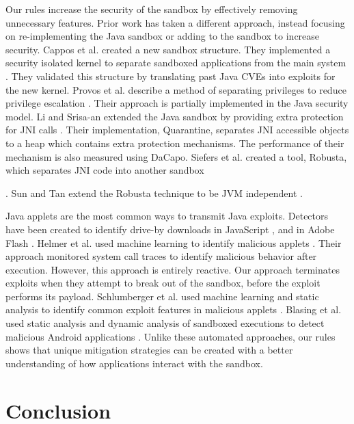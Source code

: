 \documentclass{sig-alternate}
\begin{document}
Our rules increase the security of the sandbox
by effectively removing unnecessary features. Prior work has taken a different
approach, instead focusing on re-implementing the Java sandbox or
adding to the sandbox to increase security. Cappos et al. created
a new sandbox structure. They implemented a security isolated kernel
to separate sandboxed applications from the main system \cite{cappos_retaining_2010}.
They validated this structure by translating past Java CVEs into exploits
for the new kernel. Provos et al. describe a method of separating
privileges to reduce privilege escalation \cite{Provos-PrivilegeEscalation}.
Their approach is partially implemented in the Java security model.
Li and Srisa-an extended the Java sandbox by providing extra protection
for JNI calls \cite{li_quarantine:_2011}. Their implementation, Quarantine,
separates JNI accessible objects to a heap which contains extra protection
mechanisms. The performance of their mechanism is also measured using
DaCapo. Siefers et al. created a tool, Robusta, which separates JNI
code into another sandbox \cite{siefers_robusta:_2010}%

. Sun and Tan extend the Robusta technique to be JVM independent \cite{sun_jvm-portable_2012}. 

Java applets are the most common ways to transmit Java exploits. Detectors
have been created to identify drive-by downloads in JavaScript \cite{cova_detection_2010},
and in Adobe Flash \cite{ford_analyzing_2009}. Helmer et al. used
machine learning to identify malicious applets \cite{helmer_anomalous_2001}.
Their approach monitored system call traces to identify malicious
behavior after execution. However, this approach is entirely reactive.
Our approach terminates exploits when they attempt to break out of
the sandbox, before the exploit performs its payload. Schlumberger
et al. used machine learning and static analysis to identify common
exploit features in malicious applets \cite{schlumberger_jarhead_2012}.
Blasing et al. used static analysis and dynamic analysis of sandboxed
executions to detect malicious Android applications \cite{Blasing-AndriodSandbox}.
Unlike these automated approaches, our rules shows that unique
mitigation strategies can be created with a better understanding of
how applications interact with the sandbox. 

\section{Conclusion}\label{sec:Conclusion}
\end{document}
